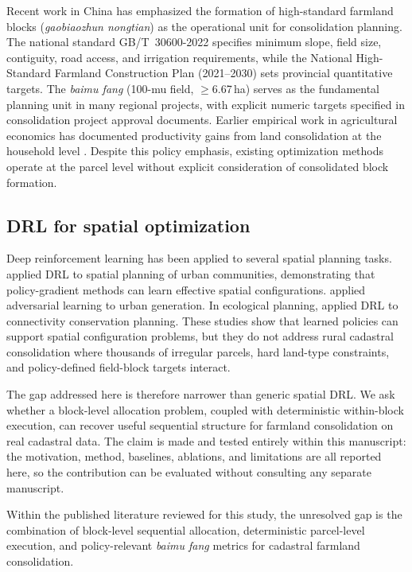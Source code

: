 \documentclass[preprint,12pt]{elsarticle}
\begin{document}
Recent work in China has emphasized the formation of high-standard farmland blocks (\textit{gaobiaozhun nongtian}) as the operational unit for consolidation planning. The national standard GB/T~30600-2022 \citep{gbt30600_2022} specifies minimum slope, field size, contiguity, road access, and irrigation requirements, while the National High-Standard Farmland Construction Plan (2021--2030) \citep{moa2021plan} sets provincial quantitative targets. The \textit{baimu fang} (100-mu field, $\geq$6.67\,ha) serves as the fundamental planning unit in many regional projects, with explicit numeric targets specified in consolidation project approval documents. Earlier empirical work in agricultural economics has documented productivity gains from land consolidation at the household level \citep{wu2005consolidation}. Despite this policy emphasis, existing optimization methods operate at the parcel level without explicit consideration of consolidated block formation.

\subsection{DRL for spatial optimization}

Deep reinforcement learning has been applied to several spatial planning tasks. \citet{zheng2023spatial} applied DRL to spatial planning of urban communities, demonstrating that policy-gradient methods can learn effective spatial configurations. \citet{wang2021deep} applied adversarial learning to urban generation. In ecological planning, \citet{equihua2024conservation} applied DRL to connectivity conservation planning. These studies show that learned policies can support spatial configuration problems, but they do not address rural cadastral consolidation where thousands of irregular parcels, hard land-type constraints, and policy-defined field-block targets interact.

The gap addressed here is therefore narrower than generic spatial DRL. We ask whether a block-level allocation problem, coupled with deterministic within-block execution, can recover useful sequential structure for farmland consolidation on real cadastral data. The claim is made and tested entirely within this manuscript: the motivation, method, baselines, ablations, and limitations are all reported here, so the contribution can be evaluated without consulting any separate manuscript.

Within the published literature reviewed for this study, the unresolved gap is the combination of block-level sequential allocation, deterministic parcel-level execution, and policy-relevant \textit{baimu fang} metrics for cadastral farmland consolidation.
\end{document}
